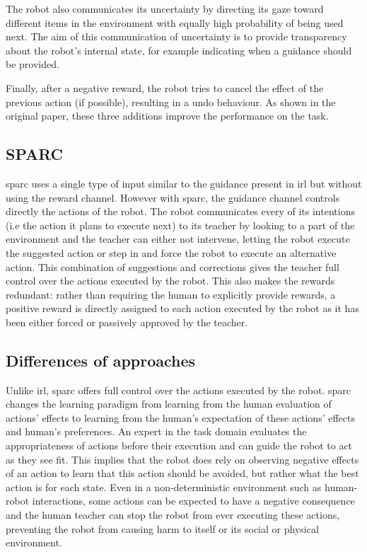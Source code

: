 The robot also communicates its uncertainty by directing its gaze toward different items in the environment with equally high probability of being used next. The aim of this communication of uncertainty is to provide transparency about the robot's internal state, for example indicating when a guidance should be provided. 

Finally, after a negative reward, the robot tries to cancel the effect of the previous action (if possible), resulting in a undo behaviour. As shown in the original paper, these three additions improve the performance on the task.

\subsection{SPARC}

\gls{sparc} uses a single type of input similar to the guidance present in \gls{irl} but without using the reward channel. However with \gls{sparc}, the guidance channel controls directly the actions of the robot. The robot communicates every of its intentions (i.e the action it plans to execute next) to its teacher by looking to a part of the environment and the teacher can either not intervene, letting the robot execute the suggested action or step in and force the robot to execute an alternative action. This combination of suggestions and corrections gives the teacher full control over the actions executed by the robot. This also makes the rewards redundant: rather than requiring the human to explicitly provide rewards, a positive reward is directly assigned to each action executed by the robot as it has been either forced or passively approved by the teacher.

\subsection{Differences of approaches}

Unlike \gls{irl}, \gls{sparc} offers full control over the actions executed by the robot. \gls{sparc} changes the learning paradigm from learning from the human evaluation of actions' effects to learning from the human's expectation of these actions' effects and human's preferences. An expert in the task domain evaluates the appropriateness of actions before their execution and can guide the robot to act as they see fit. This implies that the robot does rely on observing negative effects of an action to learn that this action should be avoided, but rather what the best action is for each state. Even in a non-deterministic environment such as human-robot interactions, some actions can be expected to have a negative consequence and the human teacher can stop the robot from ever executing these actions, preventing the robot from causing harm to itself or its social or physical environment. 

